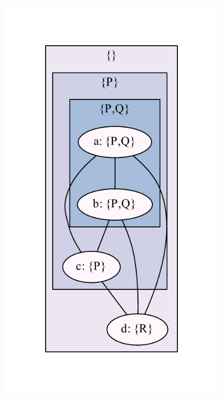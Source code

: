 \documentclass[11pt,a4paper,notitlepage,onecolumn,twoside]{article}
\begin{document}
\begin{figure}
\label{fig:indiscernibility_example}
\includegraphics{indiscernibility_example}
\end{figure}
\end{document}
